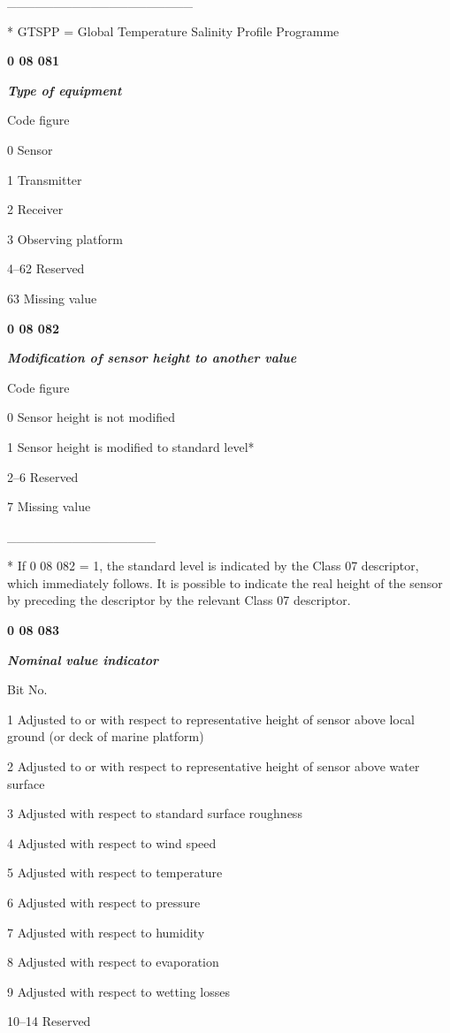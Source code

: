 \_\_\_\_\_\_\_\_\_\_\_\_\_\_\_\_\_\_\_\_

* GTSPP = Global Temperature Salinity Profile Programme

\textbf{0 08 081}

\emph{\textbf{Type of equipment}}

Code figure

0 Sensor

1 Transmitter

2 Receiver

3 Observing platform

4--62 Reserved

63 Missing value

\textbf{0 08 082}

\emph{\textbf{Modification of sensor height to another value}}

Code figure

0 Sensor height is not modified

1 Sensor height is modified to standard level*

2--6 Reserved

7 Missing value

\_\_\_\_\_\_\_\_\_\_\_\_\_\_\_\_

* If 0 08 082 = 1, the standard level is indicated by the Class 07 descriptor, which immediately follows. It is possible to indicate the real height of the sensor by preceding the descriptor by the relevant Class 07 descriptor.

\textbf{0 08 083}

\emph{\textbf{Nominal value indicator}}

Bit No.

1 Adjusted to or with respect to representative height of sensor above local ground (or deck of marine platform)

2 Adjusted to or with respect to representative height of sensor above water surface

3 Adjusted with respect to standard surface roughness

4 Adjusted with respect to wind speed

5 Adjusted with respect to temperature

6 Adjusted with respect to pressure

7 Adjusted with respect to humidity

8 Adjusted with respect to evaporation

9 Adjusted with respect to wetting losses

10--14 Reserved

